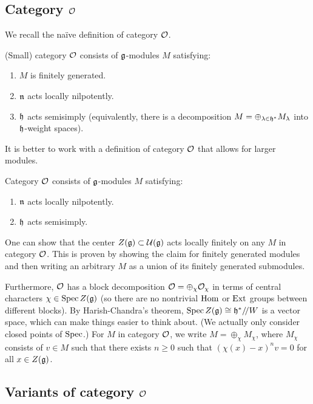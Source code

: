 \documentclass{article}
\begin{document}
\subsection{Category $\mathcal{O}$}

We recall the na\"ive definition of category $\mathcal{O}$.

\begin{dfn}
	(Small) category $\mathcal{O}$ consists of $\mathfrak{g}$-modules $M$ satisfying:
	\begin{enumerate}
		\item $M$ is finitely generated.
		\item $\mathfrak{n}$ acts locally nilpotently.
		\item $\mathfrak{h}$ acts semisimply (equivalently, there is a decomposition $M = \oplus_{\lambda \in \mathfrak{h}^*} M_\lambda$ into $\mathfrak{h}$-weight spaces).
	\end{enumerate}
\end{dfn}
It is better to work with a definition of category $\mathcal{O}$ that allows for larger modules.

\begin{dfn}
	Category $\mathcal{O}$ consists of $\mathfrak{g}$-modules $M$ satisfying:
	\begin{enumerate}
		\item $\mathfrak{n}$ acts locally nilpotently.
		\item $\mathfrak{h}$ acts semisimply.
	\end{enumerate}
\end{dfn}

One can show that the center $Z(\mathfrak{g}) \subset \mathcal{U}(\mathfrak{g})$ acts locally finitely on any $M$ in category $\mathcal{O}$.
This is proven by showing the claim for finitely generated modules and then writing an arbitrary $M$ as a union of its finitely generated submodules.

Furthermore, $\mathcal{O}$ has a block decomposition $\mathcal{O} = \oplus_\chi \mathcal{O}_\chi$ in terms of central characters $\chi \in \operatorname{Spec} Z(\mathfrak{g})$ (so there are no nontrivial $\operatorname{Hom}$ or $\operatorname{Ext}$ groups between different blocks).
By Harish-Chandra's theorem, $\operatorname{Spec} Z(\mathfrak{g}) \cong \mathfrak{h}^* /\mkern-3mu/ W$ is a vector space, which can make things easier to think about.
(We actually only consider closed points of $\operatorname{Spec}$.)
For $M$ in category $\mathcal{O}$, we write $M = \oplus_\chi M_\chi$, where $M_\chi$ consists of $v \in M$ such that there exists $n \geq 0$ such that $(\chi(x) - x)^n v = 0$ for all $x \in Z(\mathfrak{g})$.

\subsection{Variants of category $\mathcal{O}$}
\end{document}
